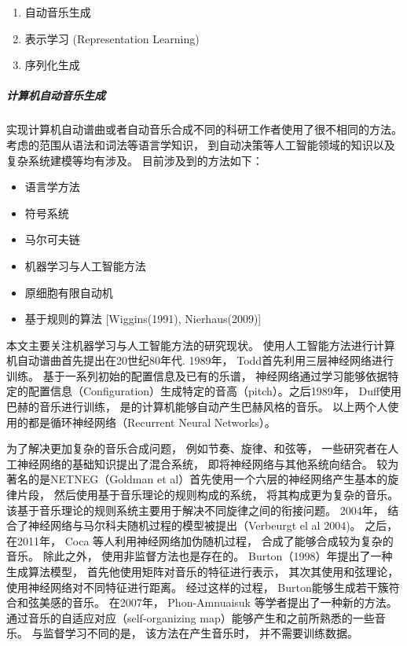 \begin{enumerate}

	\item 自动音乐生成
	\item 表示学习 (Representation Learning)
	\item 序列化生成 
	
\end{enumerate}

\subparagraph{计算机自动音乐生成} 实现计算机自动谱曲或者自动音乐合成不同的科研工作者使用了很不相同的方法。 考虑的范围从语法和词法等语言学知识， 到自动决策等人工智能领域的知识以及复杂系统建模等均有涉及。 目前涉及到的方法如下： 

\begin{itemize}

	\item 语言学方法
	\item 符号系统
	\item 马尔可夫链
	\item 机器学习与人工智能方法
	\item 原细胞有限自动机
	\item 基于规则的算法 [Wiggins(1991), Nierhaus(2009)]
	
\end{itemize}


本文主要关注机器学习与人工智能方法的研究现状。 使用人工智能方法进行计算机自动谱曲首先提出在20世纪80年代. 1989年， Todd首先利用三层神经网络进行训练。 基于一系列初始的配置信息及已有的乐谱， 神经网络通过学习能够依据特定的配置信息（Configuration）生成特定的音高（pitch）。之后1989年， Duff使用巴赫的音乐进行训练， 是的计算机能够自动产生巴赫风格的音乐。 以上两个人使用的都是循环神经网络（Recurrent Neural Networks）。 

为了解决更加复杂的音乐合成问题， 例如节奏、旋律、和弦等， 一些研究者在人工神经网络的基础知识提出了混合系统， 即将神经网络与其他系统向结合。\cite{DBLP:ALYSIA} 较为著名的是NETNEG（Goldman et al）首先使用一个六层的神经网络产生基本的旋律片段， 然后使用基于音乐理论的规则构成的系统， 将其构成更为复杂的音乐。 该基于音乐理论的规则系统主要用于解决不同旋律之间的衔接问题。 2004年， 结合了神经网络与马尔科夫随机过程的模型被提出（Verbeurgt el al 2004)。 之后， 在2011年， Coca 等人利用神经网络加伪随机过程， 合成了能够合成较为复杂的音乐。 除此之外， 使用非监督方法也是存在的。 Burton（1998）年提出了一种生成算法模型， 首先他使用矩阵对音乐的特征进行表示， 其次其使用和弦理论，使用神经网络对不同特征进行距离。 经过这样的过程， Burton能够生成若干簇符合和弦美感的音乐。 在2007年， Phon-Amnuaisuk 等学者提出了一种新的方法。 通过音乐的自适应对应（self-organizing map）能够产生和之前所熟悉的一些音乐。 与监督学习不同的是， 该方法在产生音乐时， 并不需要训练数据。 

